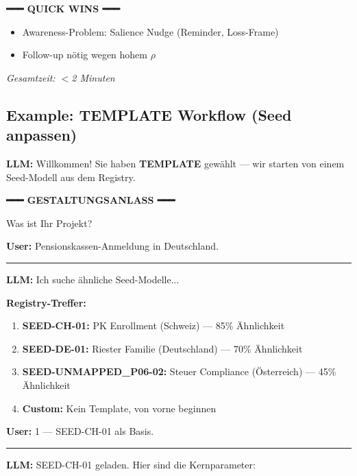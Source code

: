 \begin{tcolorbox}[colback=green!5!white, colframe=green!75!black,
    title=Example: SCHNELL Model Design (3 Questions), breakable]
{{\textbf{━━━ QUICK WINS ━━━}
\begin{itemize}[nosep]
\item Awareness-Problem: Salience Nudge (Reminder, Loss-Frame)
\item Follow-up nötig wegen hohem $\rho$
\end{itemize}
}}

\vspace{0.3em}
\textit{Gesamtzeit: $<$2 Minuten}
\end{tcolorbox}

\subsection{Example: TEMPLATE Workflow (Seed anpassen)}

\begin{tcolorbox}[colback=orange!5!white, colframe=orange!75!black,
    title=Example: TEMPLATE Model Design (Start from Seed), breakable]
\small
\textbf{LLM:} Willkommen! Sie haben \textbf{TEMPLATE} gewählt --- wir starten
von einem Seed-Modell aus dem Registry.

\vspace{0.3em}
\textbf{━━━ GESTALTUNGSANLASS ━━━}
\vspace{0.3em}

Was ist Ihr Projekt?

\textbf{User:} Pensionskassen-Anmeldung in Deutschland.

\hrule
\vspace{0.3em}

\textbf{LLM:} Ich suche ähnliche Seed-Modelle...

\textbf{Registry-Treffer:}
\begin{enumerate}
\item \textbf{SEED-CH-01:} PK Enrollment (Schweiz) --- 85\% Ähnlichkeit
\item \textbf{SEED-DE-01:} Riester Familie (Deutschland) --- 70\% Ähnlichkeit
\item \textbf{SEED-UNMAPPED_P06-02:} Steuer Compliance (Österreich) --- 45\% Ähnlichkeit
\item \textbf{Custom:} Kein Template, von vorne beginnen
\end{enumerate}

\textbf{User:} 1 --- SEED-CH-01 als Basis.

\hrule
\vspace{0.3em}

\textbf{LLM:} SEED-CH-01 geladen. Hier sind die Kernparameter:


\end{tcolorbox}
